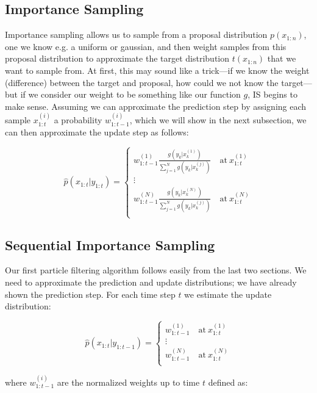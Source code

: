\documentclass{article}
\begin{document}
\subsection{Importance Sampling}
Importance sampling allows us to sample from a proposal distribution $p(x_{1:n})$, one we know e.g. a uniform or gaussian, and then weight samples from this proposal distribution to approximate the target distribution $t(x_{1:n})$ that we want to sample from. At first, this may sound like a trick---if we know the weight (difference) between the target and proposal, how could we not know the target---but if we consider our weight to be something like our function $g$, IS begins to make sense. Assuming we can approximate the prediction step by assigning each sample $x_{1:t}^{(i)}$ a probability $w_{1:t-1}^{(i)}$, which we will show in the next subsection, we can then approximate the update step as follows:

\begin{equation}
\widehat{p}(x_{1:t}|y_{1:t}) = \begin{cases}
w_{1:t-1}^{(1)}\frac{g(y_k|x_k^{(1)})}{\sum_{j=1}^N g(y_k|x_k^{(j)})} \quad \text{at} \ x_{1:t}^{(1)} \\
\vdots \\
w_{1:t-1}^{(N)}\frac{g(y_k|x_k^{(N)})}{\sum_{j=1}^N g(y_k|x_k^{(j)})} \quad \text{at} \ x_{1:t}^{(N)} \\
\end{cases}
\end{equation}

\subsection{Sequential Importance Sampling}
Our first particle filtering algorithm follows easily from the last two sections. We need to approximate the prediction and update distributions; we have already shown the prediction step. For each time step $t$ we estimate the update distribution:

\begin{equation}
\widehat{p}(x_{1:t}|y_{1:t-1}) = \begin{cases}
w_{1:t-1}^{(1)} \quad \text{at} \ x_{1:t}^{(1)} \\
\vdots \\
w_{1:t-1}^{(N)} \quad \text{at} \ x_{1:t}^{(N)} \\
\end{cases}
\end{equation}

\noindent
where $w_{1:t-1}^{(i)}$ are the normalized weights up to time $t$ defined as:
\end{document}
